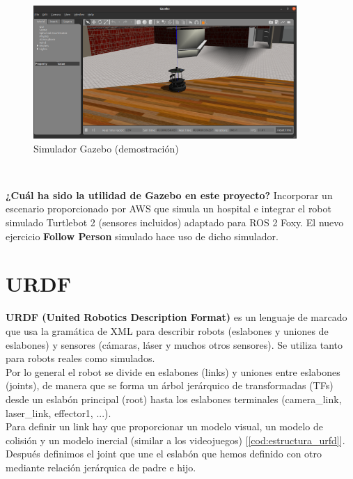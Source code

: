 \begin{figure} [H]
  \begin{center}
    \includegraphics[width=10cm]{imagenes/simulacion-gazebo.png}
  \end{center}
  \caption{Simulador Gazebo (demostración)}
  \label{fig:simulador_gazebo}
\end{figure}\

\textbf{¿Cuál ha sido la utilidad de Gazebo en este proyecto?} Incorporar un escenario proporcionado por AWS que simula un hospital e integrar el robot simulado Turtlebot 2 (sensores incluidos) adaptado para ROS 2 Foxy. El nuevo ejercicio \textbf{Follow Person} simulado hace uso de dicho simulador.\\




\section{URDF}
\label{sec:urdf}

\textbf{URDF (United Robotics Description Format)} es un lenguaje de marcado que usa la gramática de XML para describir robots (eslabones y uniones de eslabones) y sensores (cámaras, láser y muchos otros sensores). Se utiliza tanto para robots reales como simulados.\\

Por lo general el robot se divide en eslabones (links) y uniones entre eslabones (joints), de manera que se forma un árbol jerárquico de transformadas (TFs) desde un eslabón principal (root) hasta los eslabones terminales (camera\_link, laser\_link, effector1, ...).\\

Para definir un link hay que proporcionar un modelo visual, un modelo de colisión y un modelo inercial (similar a los videojuegos) [\ref{cod:estructura_urfd}]. Después definimos el joint que une el eslabón que hemos definido con otro mediante relación jerárquica de padre e hijo.\\

